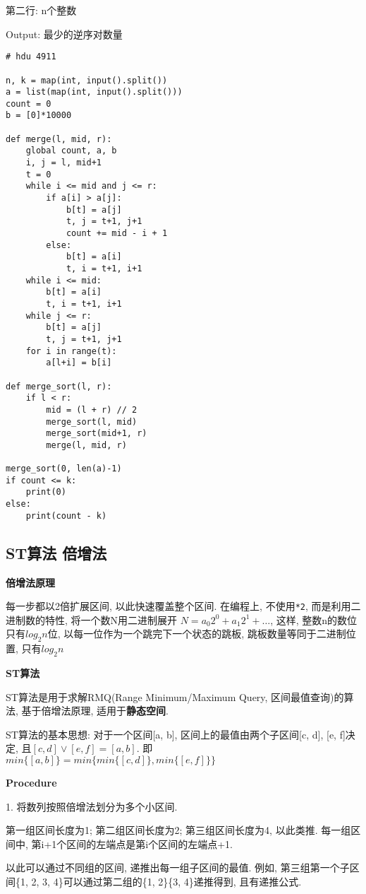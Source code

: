 \documentclass[../main]{subfiles}
\begin{document}
\begin{sloppy}
第二行: n个整数

Output: 最少的逆序对数量

\begin{lstlisting}[style = Python]
# hdu 4911

n, k = map(int, input().split())
a = list(map(int, input().split()))
count = 0
b = [0]*10000

def merge(l, mid, r):
    global count, a, b
    i, j = l, mid+1
    t = 0
    while i <= mid and j <= r:
        if a[i] > a[j]:
            b[t] = a[j]
            t, j = t+1, j+1
            count += mid - i + 1
        else:
            b[t] = a[i]
            t, i = t+1, i+1
    while i <= mid:
        b[t] = a[i]
        t, i = t+1, i+1
    while j <= r:
        b[t] = a[j]
        t, j = t+1, j+1
    for i in range(t):
        a[l+i] = b[i]

def merge_sort(l, r):
    if l < r:
        mid = (l + r) // 2
        merge_sort(l, mid)
        merge_sort(mid+1, r)
        merge(l, mid, r)

merge_sort(0, len(a)-1)
if count <= k:
    print(0)
else:
    print(count - k)
\end{lstlisting}

\newpage
\subsection{ST算法 倍增法}

\textbf{倍增法原理}

每一步都以2倍扩展区间, 以此快速覆盖整个区间. 在编程上, 不使用\verb*|*2|, 而是利用二进制数的特性, 将一个数N用二进制展开 $N = a_0 2^0 + a_1 2^1 + \dots$, 这样, 整数n的数位只有$log_2 n$位, 以每一位作为一个跳完下一个状态的跳板, 跳板数量等同于二进制位置, 只有$log_2 n$

\textbf{ST算法}

ST算法是用于求解RMQ(Range Minimum/Maximum Query, 区间最值查询)的算法, 基于倍增法原理, 适用于\textbf{静态空间}.

ST算法的基本思想: 对于一个区间[a, b], 区间上的最值由两个子区间[c, d], [e, f]决定, 且$[c, d] \vee [e, f] = [a, b]$. 即$min\{[a, b]\} = min\{min\{[c, d]\}, min\{[e, f]\}\}$

\textbf{Procedure}

1. 将数列按照倍增法划分为多个小区间. 

第一组区间长度为1; 第二组区间长度为2; 第三组区间长度为4, 以此类推. 每一组区间中, 第i+1个区间的左端点是第i个区间的左端点+1.

以此可以通过不同组的区间, 递推出每一组子区间的最值. 例如, 第三组第一个子区间\{1, 2, 3, 4\}可以通过第二组的\{1, 2\}\{3, 4\}递推得到, 且有递推公式.


\end{sloppy}
\end{document}
